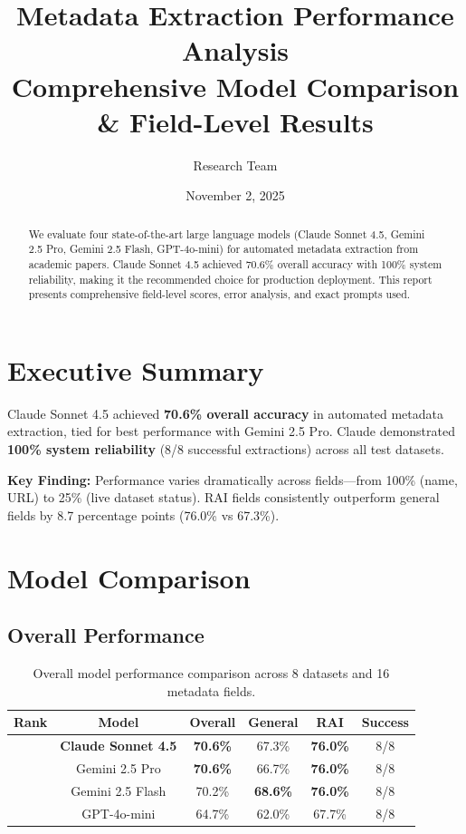 \documentclass[11pt,a4paper]{article}
\title{\textbf{Metadata Extraction Performance Analysis}\\
\Large Comprehensive Model Comparison \& Field-Level Results}
\author{Research Team}
\date{November 2, 2025}
\begin{document}
\maketitle

\begin{abstract}
We evaluate four state-of-the-art large language models (Claude Sonnet 4.5, Gemini 2.5 Pro, Gemini 2.5 Flash, GPT-4o-mini) for automated metadata extraction from academic papers. Claude Sonnet 4.5 achieved 70.6\% overall accuracy with 100\% system reliability, making it the recommended choice for production deployment. This report presents comprehensive field-level scores, error analysis, and exact prompts used.
\end{abstract}

\section*{Executive Summary}

Claude Sonnet 4.5 achieved \textbf{70.6\% overall accuracy} in automated metadata extraction, tied for best performance with Gemini 2.5 Pro. Claude demonstrated \textbf{100\% system reliability} (8/8 successful extractions) across all test datasets.

\begin{center}
\colorbox{successgreen!20}{\parbox{0.9\textwidth}{
\textbf{Key Finding:} Performance varies dramatically across fields—from 100\% (name, URL) to 25\% (live dataset status). RAI fields consistently outperform general fields by 8.7 percentage points (76.0\% vs 67.3\%).
}}
\end{center}

\section{Model Comparison}

\subsection{Overall Performance}

\begin{table}[h]
\centering
\begin{tabular}{lccccc}
\toprule
\textbf{Rank} & \textbf{Model} & \textbf{Overall} & \textbf{General} & \textbf{RAI} & \textbf{Success} \\
\midrule
🥇 & \textbf{Claude Sonnet 4.5} & \textbf{70.6\%} & 67.3\% & \textbf{76.0\%} & 8/8 \\
🥇 & Gemini 2.5 Pro & \textbf{70.6\%} & 66.7\% & \textbf{76.0\%} & 8/8 \\
🥈 & Gemini 2.5 Flash & 70.2\% & \textbf{68.6\%} & \textbf{76.0\%} & 8/8 \\
🥉 & GPT-4o-mini & 64.7\% & 62.0\% & 67.7\% & 8/8 \\
\bottomrule
\end{tabular}
\caption{Overall model performance comparison across 8 datasets and 16 metadata fields.}
\end{table}
\end{document}
